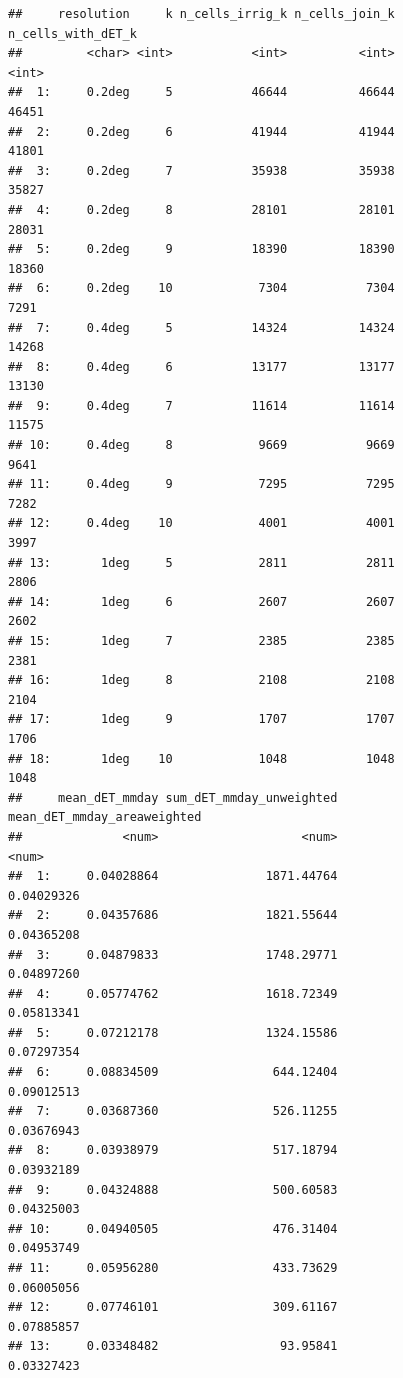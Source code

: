 \documentclass[
  11pt,
]{article}
\begin{document}
\begin{verbatim}
##     resolution     k n_cells_irrig_k n_cells_join_k n_cells_with_dET_k
##         <char> <int>           <int>          <int>              <int>
##  1:     0.2deg     5           46644          46644              46451
##  2:     0.2deg     6           41944          41944              41801
##  3:     0.2deg     7           35938          35938              35827
##  4:     0.2deg     8           28101          28101              28031
##  5:     0.2deg     9           18390          18390              18360
##  6:     0.2deg    10            7304           7304               7291
##  7:     0.4deg     5           14324          14324              14268
##  8:     0.4deg     6           13177          13177              13130
##  9:     0.4deg     7           11614          11614              11575
## 10:     0.4deg     8            9669           9669               9641
## 11:     0.4deg     9            7295           7295               7282
## 12:     0.4deg    10            4001           4001               3997
## 13:       1deg     5            2811           2811               2806
## 14:       1deg     6            2607           2607               2602
## 15:       1deg     7            2385           2385               2381
## 16:       1deg     8            2108           2108               2104
## 17:       1deg     9            1707           1707               1706
## 18:       1deg    10            1048           1048               1048
##     mean_dET_mmday sum_dET_mmday_unweighted mean_dET_mmday_areaweighted
##              <num>                    <num>                       <num>
##  1:     0.04028864               1871.44764                  0.04029326
##  2:     0.04357686               1821.55644                  0.04365208
##  3:     0.04879833               1748.29771                  0.04897260
##  4:     0.05774762               1618.72349                  0.05813341
##  5:     0.07212178               1324.15586                  0.07297354
##  6:     0.08834509                644.12404                  0.09012513
##  7:     0.03687360                526.11255                  0.03676943
##  8:     0.03938979                517.18794                  0.03932189
##  9:     0.04324888                500.60583                  0.04325003
## 10:     0.04940505                476.31404                  0.04953749
## 11:     0.05956280                433.73629                  0.06005056
## 12:     0.07746101                309.61167                  0.07885857
## 13:     0.03348482                 93.95841                  0.03327423

\end{verbatim}
\end{document}
